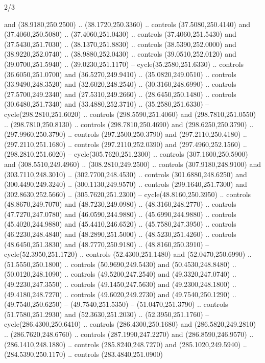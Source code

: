 \begin{flagdescription}{2/3}
\begin{scope}[xshift=0.5\flaglength,yshift=0.5\flagwidth,scale=\stretchfactor]
\begin{scope}[scale=0.001645\flagwidth,yshift=65mm,xshift=-63mm]
\begin{scope}[y=0.80pt, x=0.80pt, yscale=-1,]
\begin{scope}[cm={{1.33333,0.0,0.0,1.33333,(0.0,1e-05)}}]
  and (38.9180,250.2500) .. (38.1720,250.3360) .. controls (37.5080,250.4140)
  and (37.4060,250.5080) .. (37.4060,251.0430) .. controls (37.4060,251.5430)
  and (37.5430,251.7030) .. (38.1370,251.8830) .. controls (38.5390,252.0000)
  and (38.9220,252.0740) .. (38.9880,252.0430) .. controls (39.0510,252.0120)
  and (39.0700,251.5940) .. (39.0230,251.1170) -- cycle(35.2580,251.6330) ..
  controls (36.6050,251.0700) and (36.5270,249.9410) .. (35.0820,249.0510) ..
  controls (33.9490,248.3520) and (32.6020,248.2540) .. (30.3160,248.6990) ..
  controls (27.5700,249.2340) and (27.5310,249.2660) .. (28.6450,250.1480) ..
  controls (30.6480,251.7340) and (33.4880,252.3710) .. (35.2580,251.6330) --
  cycle(298.2810,251.6020) .. controls (298.5590,251.4060) and
  (298.7810,251.0550) .. (298.7810,250.8130) .. controls (298.7810,250.4690) and
  (298.6250,250.3790) .. (297.9960,250.3790) .. controls (297.2500,250.3790) and
  (297.2110,250.4180) .. (297.2110,251.1680) .. controls (297.2110,252.0390) and
  (297.4960,252.1560) .. (298.2810,251.6020) -- cycle(305.7620,251.2300) ..
  controls (307.1600,250.5900) and (308.5510,249.4960) .. (308.2810,249.2500) ..
  controls (307.9180,248.9100) and (303.7110,248.3010) .. (302.7700,248.4530) ..
  controls (301.6880,248.6250) and (300.4490,249.3240) .. (300.1130,249.9570) ..
  controls (299.1640,251.7300) and (302.8630,252.5660) .. (305.7620,251.2300) --
  cycle(48.8160,250.3950) .. controls (48.8670,249.7070) and (48.7230,249.0980)
  .. (48.3160,248.2770) .. controls (47.7270,247.0780) and (46.0590,244.9880) ..
  (45.6990,244.9880) .. controls (45.4020,244.9880) and (45.4410,246.6520) ..
  (45.7580,247.3950) .. controls (46.2230,248.4840) and (48.2890,251.5000) ..
  (48.5230,251.4260) .. controls (48.6450,251.3830) and (48.7770,250.9180) ..
  (48.8160,250.3910) -- cycle(52.3950,251.1720) .. controls (52.4300,251.1480)
  and (52.0470,250.6990) .. (51.5550,250.1800) .. controls (50.9690,249.5430)
  and (50.4530,248.8480) .. (50.0120,248.1090) .. controls (49.5200,247.2540)
  and (49.3320,247.0740) .. (49.2230,247.3550) .. controls (49.1450,247.5630)
  and (49.2300,248.1800) .. (49.4180,248.7270) .. controls (49.6020,249.2730)
  and (49.7540,250.1290) .. (49.7540,250.6250) -- (49.7540,251.5350) --
  (51.0470,251.3790) .. controls (51.7580,251.2930) and (52.3630,251.2030) ..
  (52.3950,251.1760) -- cycle(286.4300,250.6410) .. controls (286.4300,250.1680)
  and (286.5820,249.2810) .. (286.7620,248.6760) .. controls (287.1990,247.2270)
  and (286.8590,246.9570) .. (286.1410,248.1880) .. controls (285.8240,248.7270)
  and (285.1020,249.5940) .. (284.5390,250.1170) .. controls (283.4840,251.0900)

\end{scope}
\end{scope}
\end{scope}
\end{scope}
\end{flagdescription}
